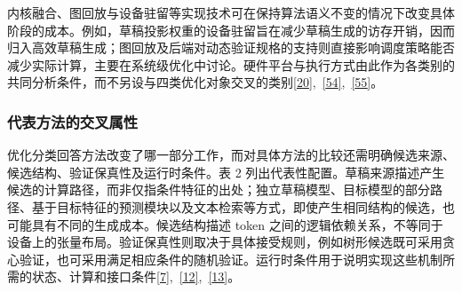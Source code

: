 \documentclass[11pt,a4paper,UTF8,fontset=none,scheme=plain,zihao=-4]{ctexart}
\begin{document}
内核融合、图回放与设备驻留等实现技术可在保持算法语义不变的情况下改变具体阶段的成本。例如，草稿投影权重的设备驻留旨在减少草稿生成的访存开销，因而归入高效草稿生成；图回放及后端对动态验证规格的支持则直接影响调度策略能否减少实际计算，主要在系统级优化中讨论。硬件平台与执行方式由此作为各类别的共同分析条件，而不另设与四类优化对象交叉的类别\protect\hyperlink{ref-vllmgraphdocs}{{[}20{]}},~\protect\hyperlink{ref-weights}{{[}54{]}},~\protect\hyperlink{ref-ascendgraphdocs}{{[}55{]}}。

\hypertarget{section-2-3-2}{%
\subsubsection{代表方法的交叉属性}\label{section-2-3-2}}

优化分类回答方法改变了哪一部分工作，而对具体方法的比较还需明确候选来源、候选结构、验证保真性及运行时条件。表
2
列出代表性配置。草稿来源描述产生候选的计算路径，而非仅指条件特征的出处；独立草稿模型、目标模型的部分路径、基于目标特征的预测模块以及文本检索等方式，即使产生相同结构的候选，也可能具有不同的生成成本。候选结构描述
token
之间的逻辑依赖关系，不等同于设备上的张量布局。验证保真性则取决于具体接受规则，例如树形候选既可采用贪心验证，也可采用满足相应条件的随机验证。运行时条件用于说明实现这些机制所需的状态、计算和接口条件\protect\hyperlink{ref-specinfer}{{[}7{]}},~\protect\hyperlink{ref-ji2026survey}{{[}12{]}},~\protect\hyperlink{ref-zhao2026survey}{{[}13{]}}。
\end{document}
